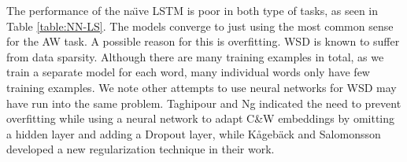 			




The performance of the na\"{\i}ve LSTM is poor in both type of tasks, as seen in Table
\ref{table:NN-LS}. The models converge to just
using the most common sense for the AW task. A possible reason for this is overfitting. WSD is known to suffer
from data sparsity. 
Although there are many training
examples in total, as we train a separate model for each word, many
individual words only have few training examples. 
We note other attempts to use neural networks for WSD may have run into the same problem. Taghipour and Ng  indicated the need to prevent overfitting while using a neural network to adapt C\&W embeddings by omitting a hidden layer and adding a Dropout layer, while K{\aa}geb{\"a}ck and Salomonsson  developed a new regularization technique in their work.
